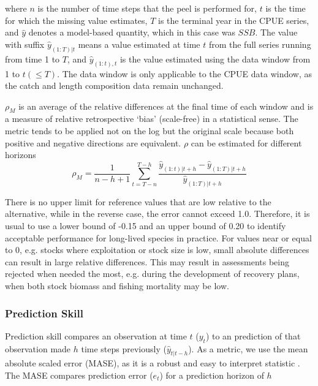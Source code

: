 \documentclass[11pt,a4paper]{article}
\begin{document}
{\noindent
where $n$ is the number of time steps that the peel is performed for, $t$ is the time for which the missing value estimates, $T$ is the terminal year in the CPUE series, and $\hat{y}$ denotes a model-based quantity, which in this case was $SSB$. The value with suffix $\hat{y}_{(1:T)|t}$ means a value estimated at time $t$ from the full series running from time 1 to $T$, and $\hat{y}_{(1:t),t}$ is the value estimated using the data window from 1 to $t (\leq T)$. The data window is only applicable to the CPUE data window, as the catch and length composition data remain unchanged.

$\rho_M$ is an average of the relative differences at the final time of each window and is a measure of relative retrospective `bias' (scale-free) in a statistical sense. The metric tends to be applied not on the log but the original scale because both positive and negative directions are equivalent. $\rho$ can be estimated for different horizons 
\begin{equation}
\label{eqn:mohn2}
\rho_{M} = \frac{1}{n-h+1} \sum_{t=T-n}^{T-h} \frac{\hat{y}_{(1:t)|t+h}-\hat{y}_{(1:T)|t+h}}{\hat{y}_{(1:T)|t+h}} 
\end{equation}

There is no upper limit for reference values that are low relative to the alternative, while in the reverse case, the error cannot exceed 1.0. Therefore, it is usual to use a lower bound of -0.15 and an upper bound of 0.20 to identify acceptable performance for long-lived species \citep{hurtado2014looking} in practice. For values near or equal to 0, e.g. stocks where exploitation or stock size is low, small absolute differences can result in large relative differences.  This may result in assessments being rejected when needed the most, e.g. during the development of recovery plans, when both stock biomass and fishing mortality may be low. 

\subsubsection{Prediction Skill}

Prediction skill compares an observation at time $t$ ($y_t$) to an prediction of that observation made $h$ time steps previously ($\hat{y}_{t|t-h}$). As a metric, we use the mean absolute scaled error (MASE), as it is a robust and easy to interpret statistic \citep{hyndman2006another}. The MASE compares prediction error ($e_t$) for a prediction horizon of $h$ 

}
\end{document}
